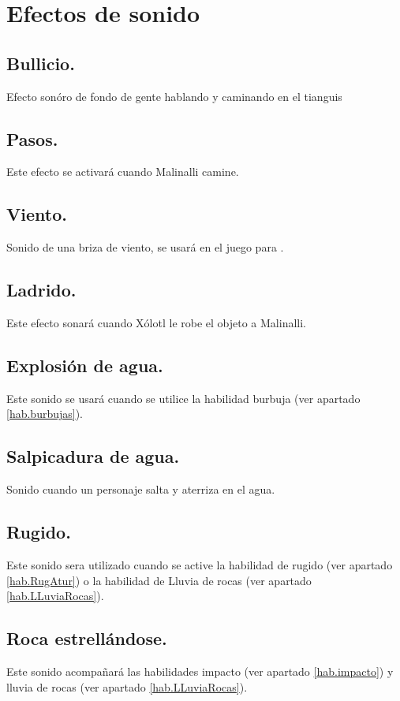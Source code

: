 \section{Efectos de sonido} 
\subsection{Bullicio.} \label{SFX:Bullicio}
Efecto sonóro de fondo de gente hablando y caminando en el tianguis
\subsection{Pasos.}\label{SFX:Pasos}
Este efecto se activará cuando Malinalli camine.
\subsection{Viento.}\label{SFX:Viento}
Sonido de una briza de viento, se usará en el juego para .
\subsection{Ladrido.}\label{SFX:Ladrido}
Este efecto sonará cuando Xólotl le robe el objeto a Malinalli.
\subsection{Explosión de agua.} \label{SFX:ExpAgua}
 Este sonido se usará cuando se utilice la habilidad burbuja (ver apartado \ref{hab.burbujas}).
\subsection{Salpicadura de agua.} \label{SFX:SalAgua}
Sonido cuando un personaje salta y aterriza en el agua.  
\subsection{Rugido.} \label{SFX:Rugido}
Este sonido sera utilizado cuando se active la habilidad de rugido (ver apartado \ref{hab.RugAtur}) o la habilidad de Lluvia de rocas (ver apartado \ref{hab.LLuviaRocas}).
\subsection{Roca estrellándose.} \label{SFX:RocaEs}
Este sonido acompañará las habilidades impacto (ver apartado \ref{hab.impacto}) y lluvia de rocas (ver apartado \ref{hab.LLuviaRocas}).
